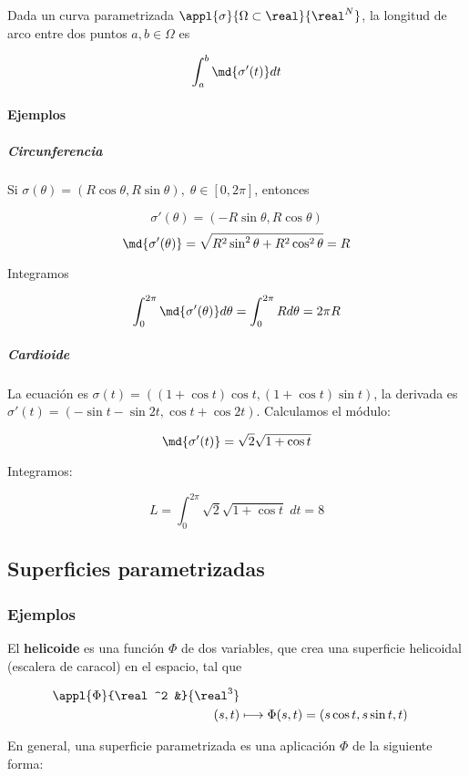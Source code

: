 \documentclass[12pt,a4paper,titlepage]{apuntes}
\begin{document}
\begin{theorem}
Dada un curva parametrizada $\appl{\sigma}{\Omega\subset\real}{\real^N}$, la longitud de arco entre dos puntos $a, b\in \Omega$ es 

\[ \int_a^b\md{\sigma'(t)}dt \]
\end{theorem}

\paragraph{Ejemplos}
\subparagraph{Circunferencia}
Si $\sigma(\theta) = (R\cos\theta, R\sin\theta),\; \theta \in [0, 2\pi]$, entonces 

\[ \sigma'(\theta) = (-R\sin\theta, R\cos\theta) \]
\[ \md{\sigma'(\theta)} = \sqrt{R^2 \sin^2\theta + R^2 \cos^2\theta} = R \]

Integramos

\[ \int_0^{2\pi} \md{\sigma'(\theta)}d\theta = \int_0^{2\pi} Rd\theta = 2\pi R \]

\subparagraph{Cardioide}
La ecuación es $\sigma(t) = ((1+\cos t)\cos t, (1+\cos t)\sin t)$, la derivada es $\sigma'(t) = (-\sin t - \sin 2t,\cos t + \cos 2t)$. Calculamos el módulo:

\[ \md{\sigma'(t)} = \sqrt{2}\sqrt{1+\cos t} \]

Integramos:

\[ L = \int_0^{2\pi}\sqrt{2}\sqrt{1+\cos t} \;dt = 8 \]

\subsection{Superficies parametrizadas}
\subsubsection{Ejemplos}

\label{Helicoide}
El \textbf{helicoide} es una función $\Phi$ de dos variables, que crea una superficie helicoidal (escalera de caracol) en el espacio, tal que 

\begin{align*} \appl{\Phi}{\real^2 &}{\real^3} \\
 (s,t) &\longmapsto \Phi(s,t) = (s\cos t, s\sin t, t) \end{align*}
 

En general, una superficie parametrizada es una aplicación $\Phi$ de la siguiente forma:
\end{document}
